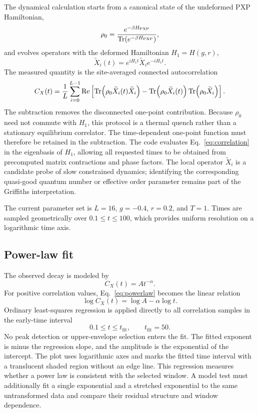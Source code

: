 \documentclass[11pt]{article}
\newcommand{\Hpxp}{H_{\mathrm{PXP}}}
\newcommand{\Xtilde}{\widetilde{X}}
\begin{document}
The dynamical calculation starts from a canonical state of the undeformed PXP
Hamiltonian,
\begin{equation}
  \rho_0=\frac{e^{-\beta\Hpxp}}
  {\Tr(e^{-\beta\Hpxp})},
\end{equation}
and evolves operators with the deformed Hamiltonian $H_1=H(g,r)$,
\begin{equation}
  \Xtilde_i(t)=e^{iH_1t}\Xtilde_i e^{-iH_1t}.
\end{equation}
The measured quantity is the site-averaged connected autocorrelation
\begin{equation}
  C_X(t)=\frac{1}{L}\sum_{i=0}^{L-1}\operatorname{Re}\left[
  \Tr\!\left(\rho_0\Xtilde_i(t)\Xtilde_i\right)
  -\Tr\!\left(\rho_0\Xtilde_i(t)\right)
   \Tr\!\left(\rho_0\Xtilde_i\right)
  \right].
  \label{eq:correlation}
\end{equation}
The subtraction removes the disconnected one-point contribution. Because $\rho_0$
need not commute with $H_1$, this protocol is a thermal quench rather than a
stationary equilibrium correlator. The time-dependent one-point function must
therefore be retained in the subtraction. The code evaluates
Eq.~\eqref{eq:correlation} in the eigenbasis of $H_1$, allowing all requested times
to be obtained from precomputed matrix contractions and phase factors. The local
operator $\Xtilde_i$ is a candidate probe of slow constrained dynamics; identifying
the corresponding quasi-good quantum number or effective order parameter remains
part of the Griffiths interpretation.

The current parameter set is $L=16$, $g=-0.4$, $r=0.2$, and $T=1$. Times are
sampled geometrically over $0.1\leq t\leq100$, which provides uniform resolution on
a logarithmic time axis.

\subsection{Power-law fit}

The observed decay is modeled by
\begin{equation}
  C_X(t)=A t^{-\alpha}.
  \label{eq:powerlaw}
\end{equation}
For positive correlation values, Eq.~\eqref{eq:powerlaw} becomes the linear relation
\begin{equation}
  \log C_X(t)=\log A-\alpha\log t.
  \label{eq:logfit}
\end{equation}
Ordinary least-squares regression is applied directly to all correlation samples in
the early-time interval
\begin{equation}
  0.1\leq t\leq t_{\mathrm{fit}},
  \qquad t_{\mathrm{fit}}=50.
\end{equation}
No peak detection or upper-envelope selection enters the fit. The fitted exponent is
minus the regression slope, and the amplitude is the exponential of the intercept.
The plot uses logarithmic axes and marks the fitted time interval with a translucent
shaded region without an edge line. This regression measures whether a power law is
consistent with the selected window. A model test must additionally fit a single
exponential and a stretched exponential to the same untransformed data and compare
their residual structure and window dependence.
\end{document}
